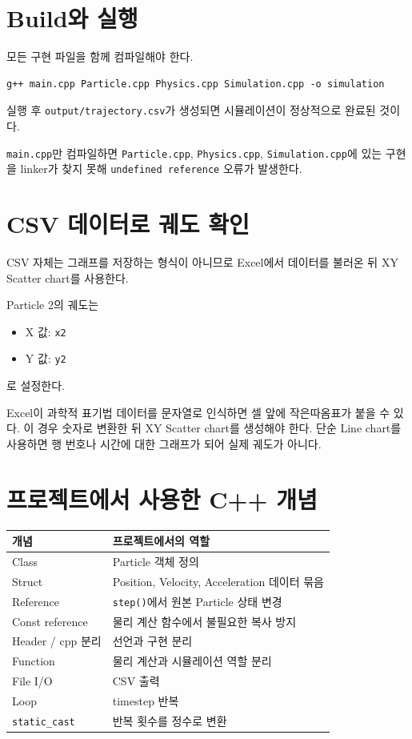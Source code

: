 \documentclass[11pt,a4paper]{article}
\begin{document}
\section{Build와 실행}
모든 구현 파일을 함께 컴파일해야 한다.

\begin{lstlisting}
g++ main.cpp Particle.cpp Physics.cpp Simulation.cpp -o simulation
\end{lstlisting}

실행 후 \texttt{output/trajectory.csv}가 생성되면 시뮬레이션이 정상적으로 완료된 것이다.

\begin{importantbox}
\texttt{main.cpp}만 컴파일하면 \texttt{Particle.cpp}, \texttt{Physics.cpp}, \texttt{Simulation.cpp}에 있는 구현을 linker가 찾지 못해 \texttt{undefined reference} 오류가 발생한다.
\end{importantbox}

\section{CSV 데이터로 궤도 확인}
CSV 자체는 그래프를 저장하는 형식이 아니므로 Excel에서 데이터를 불러온 뒤 XY Scatter chart를 사용한다.

Particle 2의 궤도는
\begin{itemize}[leftmargin=1.5em]
    \item X 값: \texttt{x2}
    \item Y 값: \texttt{y2}
\end{itemize}
로 설정한다.

\begin{importantbox}
Excel이 과학적 표기법 데이터를 문자열로 인식하면 셀 앞에 작은따옴표가 붙을 수 있다. 이 경우 숫자로 변환한 뒤 XY Scatter chart를 생성해야 한다. 단순 Line chart를 사용하면 행 번호나 시간에 대한 그래프가 되어 실제 궤도가 아니다.
\end{importantbox}

\section{프로젝트에서 사용한 C++ 개념}
\begin{center}
\begin{tabular}{ll}
\toprule
개념 & 프로젝트에서의 역할 \\
\midrule
Class & Particle 객체 정의 \\
Struct & Position, Velocity, Acceleration 데이터 묶음 \\
Reference & \texttt{step()}에서 원본 Particle 상태 변경 \\
Const reference & 물리 계산 함수에서 불필요한 복사 방지 \\
Header / cpp 분리 & 선언과 구현 분리 \\
Function & 물리 계산과 시뮬레이션 역할 분리 \\
File I/O & CSV 출력 \\
Loop & timestep 반복 \\
\texttt{static\_cast} & 반복 횟수를 정수로 변환 \\
\bottomrule
\end{tabular}
\end{center}
\end{document}
